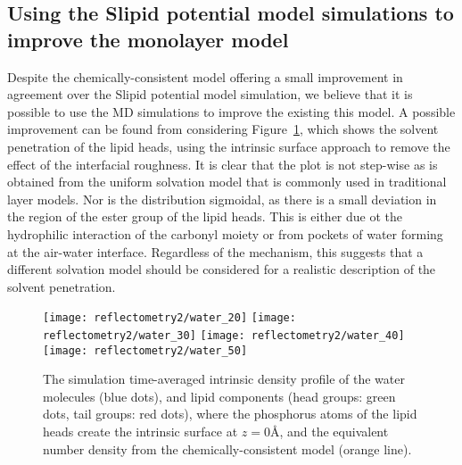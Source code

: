 \subsection{Using the Slipid potential model simulations to improve the monolayer model}
Despite the chemically-consistent model offering a small improvement in agreement over the Slipid potential model simulation, we believe that it is possible to use the MD simulations to improve the existing this model.
A possible improvement can be found from considering Figure~\ref{fig:waters}, which shows the solvent penetration of the lipid heads, using the intrinsic surface approach to remove the effect of the interfacial roughness.
It is clear that the plot is not step-wise as is obtained from the uniform solvation model that is commonly used in traditional layer models.
Nor is the distribution sigmoidal, as there is a small deviation in the region of the ester group of the lipid heads.
This is either due ot the hydrophilic interaction of the carbonyl moiety or from pockets of water forming at the air-water interface.
Regardless of the mechanism, this suggests that a different solvation model should be considered for a realistic description of the solvent penetration.
%
\begin{figure}
    \centering
    \texttt{[image: reflectometry2/water\_20]}
    \texttt{[image: reflectometry2/water\_30]}
    \texttt{[image: reflectometry2/water\_40]}
    \texttt{[image: reflectometry2/water\_50]}
    \caption{The simulation time-averaged intrinsic density profile of the water molecules (blue dots), and lipid components (head groups: green dots, tail groups: red dots), where the phosphorus atoms of the lipid heads create the intrinsic surface at $z=0$\si{\angstrom}, and the equivalent number density from the chemically-consistent model (orange line).}
    \label{fig:waters}
\end{figure}
%

